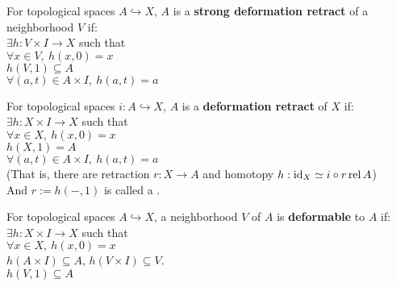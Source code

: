     \begin{defn}
        For topological spaces $A \hookrightarrow X$, 
        $A$ is a \textbf{strong deformation retract} of a neighborhood $V$
        if:\\
        $\exists h : V \times I \to X$ such that\\
        $\forall x \in V,\ h(x,0) = x$\\
        $h(V,1) \subseteq A$\\
        $\forall (a,t) \in A \times I,\ h(a,t) = a$
    \end{defn}

    \begin{defn}
        For topological spaces $i : A \hookrightarrow X$, 
        $A$ is a \textbf{deformation retract} of $X$
        if:\\
        $\exists h : X \times I \to X$ such that\\
        $\forall x \in X,\ h(x,0) = x$\\
        $h(X,1) = A$\\
        $\forall (a,t) \in A \times I,\ h(a,t) = a$\\
        (That is, there are retraction $r : X \to A$ and homotopy $h : \mathrm{id}_X \simeq i \circ r \mathrm{\ \!rel\ \!} A$)\\
        And $r := h(-,1)$ is called a .
    \end{defn}

    \begin{defn}
        For topological spaces $A \hookrightarrow X$, 
        a neighborhood $V$ of $A$ is \textbf{deformable}\label{hyp:deformable} to $A$ if:\\
        $\exists h : X \times I \to X$ such that\\
        $\forall x \in X,\ h(x,0) = x$\\
        $h(A \times I) \subseteq A$, $h(V \times I) \subseteq V$.\\
        $h(V,1) \subseteq A$
    \end{defn}

